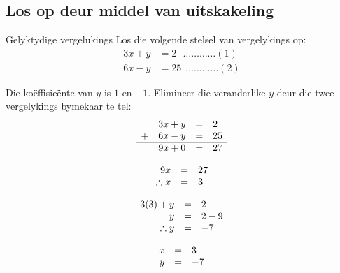 \subsection*{Los op deur middel van uitskakeling}

\begin{wex}
{Gelyktydige vergelukings}
{
Los die volgende stelsel van vergelykings op:
\begin{align*}
  3x+y &= 2  ~~~\ldots \ldots \ldots \ldots (1)\\
  6x-y &= 25 ~~\ldots \ldots \ldots \ldots (2)
\end{align*}
}
{
Die ko\"effisie\"ente van $y$ is $1$ en $-1$. Elimineer die veranderlike $y$ deur die twee vergelykings bymekaar te tel:
\begin{equation*}
\begin{array}{ccll}\hfill & 3x+y& =& 2\hfill \\ 
\hfill+ & 6x-y& =& 25\hfill \\ \hline
 \hfill & 9x + 0 &=& 27
\end{array}
\end{equation*}


\begin{equation*}
    \begin{array}{ccl}\hfill 9x& =& 27\hfill \\
	\hfill \therefore x  & =& 3\hfill 
    \end{array}
\end{equation*}

\begin{equation*}
    \begin{array}{ccl}\hfill 3(3) + y &=& 2\\
	\hfill y & =& 2-9\\
	\hfill \therefore y & =& -7 
   \end{array}
\end{equation*}


\begin{equation*}
\begin{array}{ccc}
 \hfill x& =& 3\hfill \\
\hfill y& =& -7\hfill 
\end{array}
\end{equation*}
}
\end{wex}


